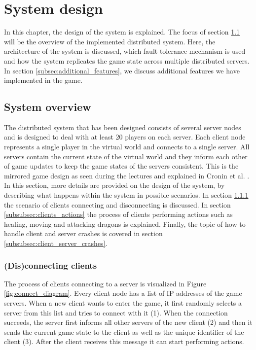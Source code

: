 \section{System design}
\label{sec:design}
In this chapter, the design of the system is explained. The focus of section \ref{subsec:system_overview} will be the overview of the implemented distributed system.
Here, the architecture of the system is discussed, which fault tolerance mechanism is used and how the system replicates the game state across multiple distributed servers. 
In section \ref{subsec:additional_features}, we discuss additional features we have implemented in the game.

\subsection{System overview}
\label{subsec:system_overview}
The distributed system that has been designed consists of several server nodes and is designed to deal with at least 20 players on each server. 
Each client node represents a single player in the virtual world and connects to a single server.
All servers contain the current state of the virtual world and they inform each other of game updates to keep the game states of the servers consistent. 
This is the mirrored game design as seen during the lectures and explained in Cronin et al. \cite{cronin2002efficient}. 
In this section, more details are provided on the design of the system, by describing what happens within the system in possible scenarios. 
In section \ref{subsubsec:disconnecting_clients} the scenario of clients connecting and disconnecting is discussed. 
In section \ref{subsubsec:clients_actions} the process of clients performing actions such as healing, moving and attacking dragons is explained. 
Finally, the topic of how to handle client and server crashes is covered in section \ref{subsubsec:client_server_crashes}.

\subsubsection{(Dis)connecting clients}
\label{subsubsec:disconnecting_clients}
The process of clients connecting to a server is visualized in Figure \ref{fig:connect_diagram}. 
Every client node has a list of IP addresses of the game servers. When a new client wants to enter the game, it first randomly selects a server from this list and tries to connect with it (1). 
When the connection succeeds, the server first informs all other servers of the new client (2) and then it sends the current game state to the client as well as the unique identifier of the client (3). 
After the client receives this message it can start performing actions.

